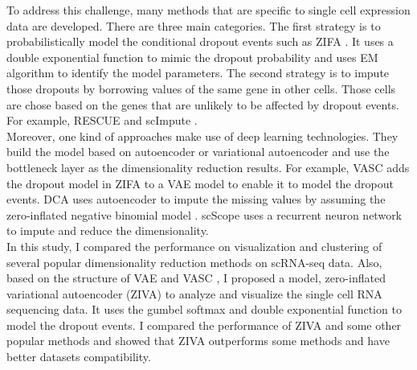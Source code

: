 To address this challenge, many methods that are specific to single cell expression data are developed. There are three main categories. The first strategy is to probabilistically model the conditional dropout events such as ZIFA \cite{Pierson2015}. It uses a double exponential function to mimic the dropout probability and uses EM algorithm \cite{mclachlan2007algorithm} to identify the model parameters.
The second strategy is to impute those dropouts by borrowing values of the same gene in other cells. Those cells are chose based on the genes that are unlikely to be affected by dropout events. For example, RESCUE \cite{Tracy2019} and scImpute \cite{Li2018}. \\
Moreover, one kind of approaches make use of deep learning technologies. They build the model based on autoencoder or variational autoencoder and use the bottleneck layer as the dimensionality reduction results. For example, VASC \cite{Wang2018} adds the dropout model in ZIFA to a VAE model to enable it to model the dropout events. DCA \cite{Eraslan2019a} uses autoencoder to impute the missing values by assuming the zero-inflated negative binomial model \cite{Hafemeister2019}. scScope \cite{Deng2019} uses a recurrent neuron network to impute and reduce the dimensionality. \\
In this study, I compared the performance on visualization and clustering of several popular dimensionality reduction methods on scRNA-seq data. Also, based on the structure of VAE \cite{Kingma2014} and VASC \cite{Wang2018}, I proposed a model, zero-inflated variational autoencoder (ZIVA) to analyze and visualize the single cell RNA sequencing data. It uses the gumbel softmax and double exponential function to model the dropout events. I compared the performance of ZIVA and some other popular methods and showed that ZIVA outperforms some methods and have better datasets compatibility.

